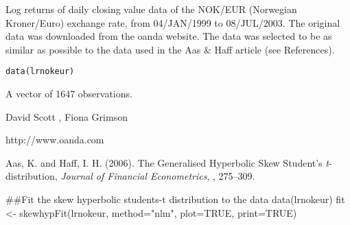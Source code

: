 \begin{Description}\relax
Log returns of daily closing value data of the NOK/EUR (Norwegian
Kroner/Euro) exchange rate, from 04/JAN/1999 to 08/JUL/2003. The
original data was downloaded from the oanda website. The data was
selected to be as similar as possible to the data used in the Aas \&
Haff article (see References).
\end{Description}
\begin{Usage}
\begin{verbatim}
data(lrnokeur)
\end{verbatim}
\end{Usage}
\begin{Format}\relax
A vector of 1647 observations.
\end{Format}
\begin{Author}\relax
David Scott , Fiona Grimson
\end{Author}
\begin{Source}\relax
http://www.oanda.com
\end{Source}
\begin{References}\relax
Aas, K. and Haff, I. H. (2006).
The Generalised Hyperbolic Skew Student's \emph{t}-distribution,
\emph{Journal of Financial Econometrics}, , 275--309.
\end{References}
\begin{Examples}
\begin{ExampleCode}
##Fit the skew hyperbolic students-t distribution to the data
data(lrnokeur)
fit <- skewhypFit(lrnokeur, method="nlm", plot=TRUE, print=TRUE)
\end{ExampleCode}
\end{Examples}

